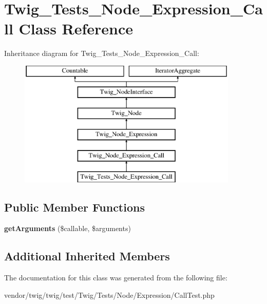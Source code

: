 \hypertarget{classTwig__Tests__Node__Expression__Call}{}\section{Twig\+\_\+\+Tests\+\_\+\+Node\+\_\+\+Expression\+\_\+\+Call Class Reference}
\label{classTwig__Tests__Node__Expression__Call}
Inheritance diagram for Twig\+\_\+\+Tests\+\_\+\+Node\+\_\+\+Expression\+\_\+\+Call\+:\begin{figure}[H]
\begin{center}
\leavevmode
\includegraphics[height=6.000000cm]{classTwig__Tests__Node__Expression__Call}
\end{center}
\end{figure}
\subsection*{Public Member Functions}
\begin{DoxyCompactItemize}
\item 
{\bfseries get\+Arguments} (\$callable, \$arguments)\hypertarget{classTwig__Tests__Node__Expression__Call_a431d6811d3611677668fd0c8583dfe89}{}\label{classTwig__Tests__Node__Expression__Call_a431d6811d3611677668fd0c8583dfe89}

\end{DoxyCompactItemize}
\subsection*{Additional Inherited Members}


The documentation for this class was generated from the following file\+:\begin{DoxyCompactItemize}
\item 
vendor/twig/twig/test/\+Twig/\+Tests/\+Node/\+Expression/Call\+Test.\+php\end{DoxyCompactItemize}
